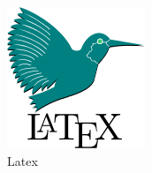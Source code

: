 \documentclass[a4paper]{article}
\begin{document}
\begin{figure}[p!]
  \includegraphics[width=\linewidth]{images/latex.png}
  \caption{Latex}
  \label{fig:float-on an extra page}
\end{figure}
\end{document}
